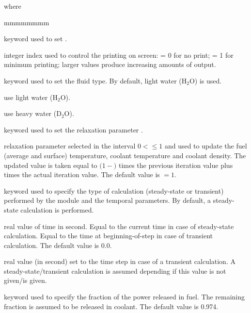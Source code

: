 \noindent where
\begin{ListeDeDescription}{mmmmmmmm}

\item[\moc{EDIT}] keyword used to set .

\item[\dusa{iprint}] integer index used to control the printing on screen:
= 0 for no print; = 1 for minimum printing; larger values produce
increasing amounts of output.

\item[\moc{FLUID}] keyword used to set the fluid type. By default, light water (H$_2$O) is used.

\item[\moc{H2O}] use light water (H$_2$O).

\item[\moc{D2O}] use heavy water (D$_2$O).

\item[\moc{RELAX}] keyword used to set the relaxation parameter .

\item[\dusa{relax}] relaxation parameter selected in the interval $0<$$\le 1$ and used to update
the fuel (average and surface) temperature, coolant temperature and coolant density. The updated value is taken equal to
$(1-$$)$ times the previous iteration value plus  times the actual iteration value. The default
value is $=1$.

\item[\moc{TIME}] keyword used to specify the type of calculation (steady-state or transient) performed by the  module and the temporal parameters. By default, a steady-state calculation is performed.
\item[\dusa{time}] real value of time in second. Equal to the current time in case of steady-state calculation. Equal to the time at beginning-of-step in
case of transient calculation. The default value is 0.0.
\item[\dusa{timestep}] real value (in second) set to the time step in case of a transient calculation. A steady-state/transient calculation is assumed
depending if this value is not given/is given. 

\item[\moc{FPUISS}] keyword used to specify the fraction of the power released in fuel. The remaining
fraction is assumed to be released in coolant. The default value is 0.974.


\end{ListeDeDescription}
